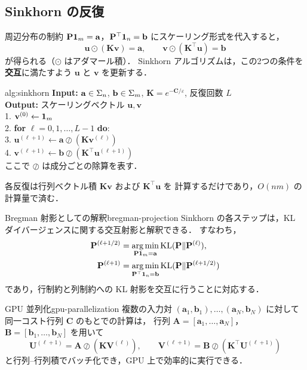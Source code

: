 \subsection{Sinkhorn の反復}

周辺分布の制約 $\mathbf{P}\mathbf{1}_m = \mathbf{a}$，$\mathbf{P}^\top \mathbf{1}_n = \mathbf{b}$
にスケーリング形式を代入すると，
\[
  \mathbf{u} \odot (\mathbf{K} \mathbf{v}) = \mathbf{a}, \qquad
  \mathbf{v} \odot (\mathbf{K}^\top \mathbf{u}) = \mathbf{b}
\]
が得られる（$\odot$ はアダマール積）．
Sinkhorn アルゴリズムは，この2つの条件を\textbf{交互}に満たすよう
$\mathbf{u}$ と $\mathbf{v}$ を更新する．

\begin{algorithm}{alg:sinkhorn}
  \textbf{Input:} $\mathbf{a} \in \Sigma_n$, $\mathbf{b} \in \Sigma_m$,
  $\mathbf{K} = e^{-\mathbf{C}/\varepsilon}$, 反復回数 $L$ \\
  \textbf{Output:} スケーリングベクトル $\mathbf{u}, \mathbf{v}$ \\[4pt]
  1. $\mathbf{v}^{(0)} \leftarrow \mathbf{1}_m$ \\
  2. \textbf{for} $\ell = 0, 1, \ldots, L-1$ \textbf{do}: \\
  3. \quad $\mathbf{u}^{(\ell+1)} \leftarrow \mathbf{a} \oslash (\mathbf{K} \mathbf{v}^{(\ell)})$ \\
  4. \quad $\mathbf{v}^{(\ell+1)} \leftarrow \mathbf{b} \oslash (\mathbf{K}^\top \mathbf{u}^{(\ell+1)})$ \\[4pt]
  ここで $\oslash$ は成分ごとの除算を表す．
\end{algorithm}

各反復は行列ベクトル積 $\mathbf{K}\mathbf{v}$ および $\mathbf{K}^\top \mathbf{u}$ を
計算するだけであり，$O(nm)$ の計算量で済む．

\begin{remark}{Bregman 射影としての解釈}{bregman-projection}
  Sinkhorn の各ステップは，KL ダイバージェンスに関する交互射影と解釈できる．
  すなわち，
  \begin{align*}
    \mathbf{P}^{(\ell+1/2)}
      &= \operatorname*{arg\,min}_{\mathbf{P}\mathbf{1}_m = \mathbf{a}} \mathrm{KL}(\mathbf{P} \| \mathbf{P}^{(\ell)}),
    \\
    \mathbf{P}^{(\ell+1)}
      &= \operatorname*{arg\,min}_{\mathbf{P}^\top \mathbf{1}_n = \mathbf{b}}
      \mathrm{KL}(\mathbf{P} \| \mathbf{P}^{(\ell+1/2)})
  \end{align*}
  であり，行制約と列制約への KL 射影を交互に行うことに対応する．
\end{remark}

\begin{remark}{GPU 並列化}{gpu-parallelization}
  複数の入力対 $(\mathbf{a}_1, \mathbf{b}_1), \ldots, (\mathbf{a}_N, \mathbf{b}_N)$ に対して
  同一コスト行列 $\mathbf{C}$ のもとでの計算は，
  行列 $\mathbf{A} = [\mathbf{a}_1, \ldots, \mathbf{a}_N]$，
  $\mathbf{B} = [\mathbf{b}_1, \ldots, \mathbf{b}_N]$ を用いて
  \[
    \mathbf{U}^{(\ell+1)} = \mathbf{A} \oslash (\mathbf{K} \mathbf{V}^{(\ell)}), \qquad
    \mathbf{V}^{(\ell+1)} = \mathbf{B} \oslash (\mathbf{K}^\top \mathbf{U}^{(\ell+1)})
  \]
  と行列--行列積でバッチ化でき，GPU 上で効率的に実行できる．
\end{remark}

